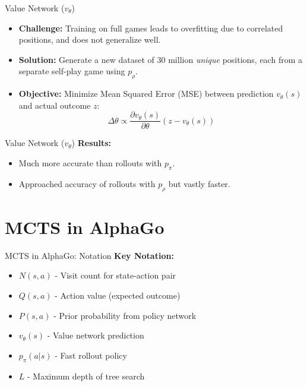 \documentclass{beamer}
\begin{document}
\begin{frame}{Value Network ($v_{\theta}$)}
    \begin{itemize}
        \item \textbf{Challenge:} Training on full games leads to overfitting due to correlated positions, and does not generalize well.
        \item \textbf{Solution:} Generate a new dataset of 30 million \textit{unique} positions, each from a separate self-play game using $p_{\rho}$.
        \item \textbf{Objective:} Minimize Mean Squared Error (MSE) between prediction $v_{\theta}(s)$ and actual outcome $z$:
        $$ \Delta\theta \propto \frac{\partial v_{\theta}(s)}{\partial\theta} (z - v_{\theta}(s)) $$
    \end{itemize}
\end{frame}

\begin{frame}{Value Network ($v_{\theta}$)}
    \textbf{Results:}
    \vspace{2ex}
    \begin{itemize}
        \item Much more accurate than rollouts with $p_{\pi}$.
        \item Approached accuracy of rollouts with $p_{\rho}$ but vastly faster.
    \end{itemize}
\end{frame}

\section{MCTS in AlphaGo}
\begin{frame}{MCTS in AlphaGo: Notation}
    \textbf{Key Notation:}
    \vspace{2ex}
    \begin{itemize}
        \setlength{\itemsep}{2ex}
        \item $N(s,a)$ - Visit count for state-action pair
        \item $Q(s,a)$ - Action value (expected outcome)
        \item $P(s,a)$ - Prior probability from policy network
        \item $v_{\theta}(s)$ - Value network prediction
        \item $p_{\pi}(a|s)$ - Fast rollout policy
        \item $L$ - Maximum depth of tree search
    \end{itemize}
\end{frame}
\end{document}
